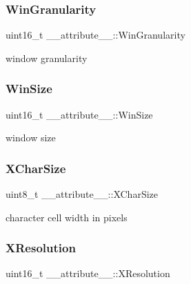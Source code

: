 \subsubsection{\texorpdfstring{Win\+Granularity}{WinGranularity}}
{\footnotesize\ttfamily uint16\+\_\+t \+\_\+\+\_\+attribute\+\_\+\+\_\+\+::\+Win\+Granularity}



window granularity 

\hypertarget{struct____attribute_____ad26e754fe362f3085c7ec4c0e5e75a6f}{}\label{struct____attribute_____ad26e754fe362f3085c7ec4c0e5e75a6f} 
\subsubsection{\texorpdfstring{Win\+Size}{WinSize}}
{\footnotesize\ttfamily uint16\+\_\+t \+\_\+\+\_\+attribute\+\_\+\+\_\+\+::\+Win\+Size}



window size 

\hypertarget{struct____attribute_____acac41a300563737d7849a92cd1d5c10b}{}\label{struct____attribute_____acac41a300563737d7849a92cd1d5c10b} 
\subsubsection{\texorpdfstring{X\+Char\+Size}{XCharSize}}
{\footnotesize\ttfamily uint8\+\_\+t \+\_\+\+\_\+attribute\+\_\+\+\_\+\+::\+X\+Char\+Size}



character cell width in pixels 

\hypertarget{struct____attribute_____abe48e2b29aa99e813a1447d22711f4f4}{}\label{struct____attribute_____abe48e2b29aa99e813a1447d22711f4f4} 
\subsubsection{\texorpdfstring{X\+Resolution}{XResolution}}
{\footnotesize\ttfamily uint16\+\_\+t \+\_\+\+\_\+attribute\+\_\+\+\_\+\+::\+X\+Resolution}



